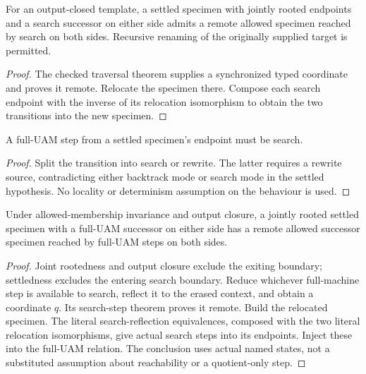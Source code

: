 



\begin{theorem}
For an output-closed template, a settled specimen with jointly rooted endpoints
and a search successor on either side admits a remote allowed specimen reached
by search on both sides. Recursive renaming of the originally supplied target
is permitted.
\end{theorem}
\begin{proof}
The checked traversal theorem supplies a synchronized typed coordinate and
proves it remote. Relocate the specimen there. Compose each search endpoint
with the inverse of its relocation isomorphism to obtain the two transitions
into the new specimen.
\end{proof}


\begin{lemma}
A full-UAM step from a settled specimen's endpoint must be search.
\end{lemma}
\begin{proof}
Split the transition into search or rewrite. The latter requires a rewrite
source, contradicting either backtrack mode or search mode in the settled
hypothesis. No locality or determinism assumption on the behaviour is used.
\end{proof}
\begin{theorem}
Under allowed-membership invariance and output closure, a jointly rooted
settled specimen with a full-UAM successor on either side has a remote allowed
successor specimen reached by full-UAM steps on both sides.
\end{theorem}
\begin{proof}
Joint rootedness and output closure exclude the exiting boundary; settledness
excludes the entering search boundary. Reduce whichever full-machine step is
available to search, reflect it to the erased context, and obtain a coordinate
$q$. Its search-step theorem proves it remote. Build the relocated specimen.
The literal search-reflection equivalences, composed with the two literal
relocation isomorphisms, give actual search steps into its endpoints. Inject
these into the full-UAM relation. The conclusion uses actual named states,
not a substituted assumption about reachability or a quotient-only step.
\end{proof}

